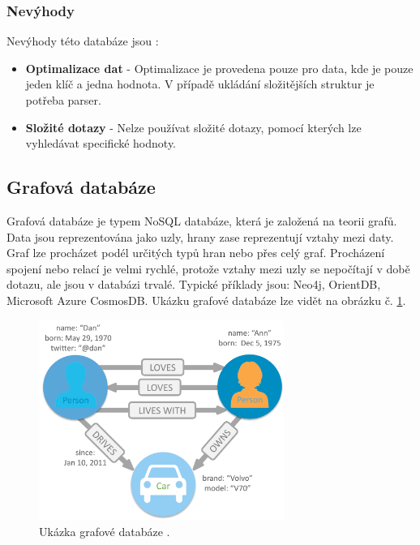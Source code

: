 \subsubsection{Nevýhody}
Nevýhody této databáze jsou \cite{advantages_keyvalue}:
\begin{itemize}
\item \textbf{Optimalizace dat} - Optimalizace je provedena pouze pro data, kde je pouze jeden klíč a jedna hodnota. V případě ukládání složitějších struktur je potřeba parser. 
\item \textbf{Složité dotazy} - Nelze používat složité dotazy, pomocí kterých lze vyhledávat specifické hodnoty.
\end{itemize}

\subsection{Grafová databáze}
Grafová databáze je typem NoSQL databáze, která je založená na teorii grafů. Data jsou reprezentována jako uzly, hrany zase reprezentují vztahy mezi daty. Graf lze procházet podél určitých typů hran nebo přes celý graf. Procházení spojení nebo relací je velmi rychlé, protože vztahy mezi uzly se nepočítají v době dotazu, ale jsou v databázi trvalé. Typické příklady jsou: Neo4j, OrientDB, Microsoft Azure CosmosDB. Ukázku grafové databáze lze vidět na obrázku č. \ref{fig:db_img_graph}.
	\begin{figure}[H]
	\centering
	\includegraphics[width=8cm]{img/databaze/graph_db}
	\caption{Ukázka grafové databáze \cite{neo_graph}.}
	\label{fig:db_img_graph}
	\end{figure}

